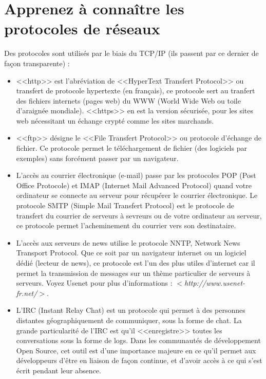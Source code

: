 \documentclass[11pt,twoside,a4paper]{article}
\begin{document}
\section{Apprenez {\`a} conna{\^i}tre les protocoles de r{\'e}seaux}
		Des protocoles sont utilis{\'e}s par le biais du TCP/IP (ils passent par ce dernier de fa\c{c}on transparente) : 
\begin{itemize}
	\item <<http>> est l'abr{\'e}viation de <<HyperText Transfert Protocol>> ou transfert de protocole hypertexte (en fran\c{c}ais), ce protocole sert au tranfert des fichiers internets (pages web) du WWW (World Wide Web ou toile d'araign{\'e}e mondiale). <<https>> en est la version s{\'e}curis{\'e}e, pour les sites web n{\'e}cessitant un {\'e}change crypt{\'e} comme les sites marchands. 
	\item <<ftp>> d{\'e}signe le <<File Transfert Protocol>> ou protocole d'{\'e}change de fichier. Ce protocole permet le t{\'e}l{\'e}chargement de fichier (des logiciels par exemples) sans forc{\'e}ment passer par un navigateur. 
	\item L'acc{\`e}s au courrier {\'e}lectronique (e-mail) passe par les protocoles POP (Post Office Protocole) et IMAP (Internet Mail Advanced Protocol) quand votre ordinateur se connecte au serveur pour r{\'e}cup{\'e}rer le courrier {\'e}lectronique. Le protocole SMTP (Simple Mail Transfert Protocol) est le protocole de transfert du courrier de serveurs {\`a} sevreurs ou de votre ordinateur au serveur, ce protocole permet l'acheminement du courrier vers son destinataire. 
	\item L'acc{\`e}s aux serveurs de news utilise le protocole NNTP, Network News Transport Protocol. Que ce soit par un navigateur internet ou un logiciel d{\'e}di{\'e} (lecteur de news), ce protocole est l'un des plus utiles d'internet car il permet la transmission de messages sur un th{\`e}me particulier de serveurs {\`a} serveurs. Voyez Usenet pour plus d'informations : $<$\emph{http://www.usenet-fr.net/}$>$. 
	\item L'IRC (Instant Relay Chat) est un protocole qui permet {\`a} des personnes distantes g{\'e}ographiquement de communiquer, sous la forme de chat. La grande particularit{\'e} de l'IRC est qu'il <<enregistre>> toutes les conversations sous la forme de logs. Dans les communaut{\'e}s de d{\'e}veloppement Open Source, cet outil est d'une importance majeure en ce qu'il permet aux d{\'e}veloppeurs d'{\^e}tre en liaison de fa\c{c}on continue, et d'avoir acc{\`e}s {\`a} ce qui s'est {\'e}crit pendant leur absence.
\end{itemize}~\\
\end{document}
